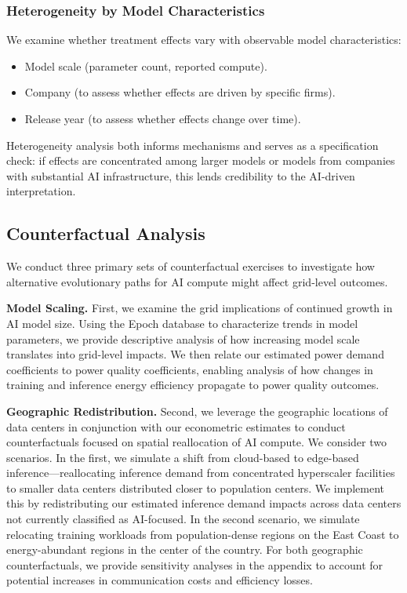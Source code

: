 \documentclass[a4paper,fleqn,longmktitle]{cas-sc}
\theoremstyle{plain}
\theoremstyle{definition}
\begin{document}
\subsubsection{Heterogeneity by Model Characteristics}

We examine whether treatment effects vary with observable model characteristics:
\begin{itemize}
    \item Model scale (parameter count, reported compute).
    \item Company (to assess whether effects are driven by specific firms).
    \item Release year (to assess whether effects change over time).
\end{itemize}
Heterogeneity analysis both informs mechanisms and serves as a specification check: if effects are concentrated among larger models or models from companies with substantial AI infrastructure, this lends credibility to the AI-driven interpretation.

\subsection{Counterfactual Analysis}\label{counterfactuals}%

We conduct three primary sets of counterfactual exercises to investigate how alternative evolutionary paths for AI compute might affect grid-level outcomes.

\textbf{Model Scaling.} First, we examine the grid implications of continued growth in AI model size. Using the Epoch database to characterize trends in model parameters, we provide descriptive analysis of how increasing model scale translates into grid-level impacts. We then relate our estimated power demand coefficients to power quality coefficients, enabling analysis of how changes in training and inference energy efficiency propagate to power quality outcomes.

\textbf{Geographic Redistribution.} Second, we leverage the geographic locations of data centers in conjunction with our econometric estimates to conduct counterfactuals focused on spatial reallocation of AI compute. We consider two scenarios. In the first, we simulate a shift from cloud-based to edge-based inference—reallocating inference demand from concentrated hyperscaler facilities to smaller data centers distributed closer to population centers. We implement this by redistributing our estimated inference demand impacts across data centers not currently classified as AI-focused. In the second scenario, we simulate relocating training workloads from population-dense regions on the East Coast to energy-abundant regions in the center of the country. For both geographic counterfactuals, we provide sensitivity analyses in the appendix to account for potential increases in communication costs and efficiency losses.
\end{document}
